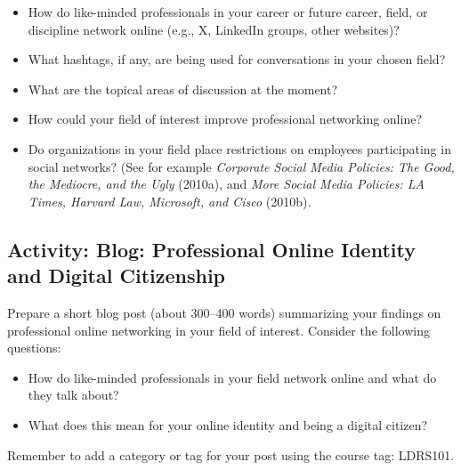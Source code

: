 \documentclass[
  letterpaper,
  DIV=11,
  numbers=noendperiod]{scrreprt}
\providecommand{\tightlist}{%
  \setlength{\itemsep}{0pt}\setlength{\parskip}{0pt}}\usepackage{longtable,booktabs,array}
\begin{document}
\begin{tcolorbox}
\begin{itemize}
\tightlist
\item
  How do like-minded professionals in your career or future career,
  field, or discipline network online (e.g., X, LinkedIn groups, other
  websites)?
\item
  What hashtags, if any, are being used for conversations in your chosen
  field?
\item
  What are the topical areas of discussion at the moment?
\item
  How could your field of interest improve professional networking
  online?
\item
  Do organizations in your field place restrictions on employees
  participating in social networks? (See for example \emph{Corporate
  Social Media Policies: The Good, the Mediocre, and the Ugly} (2010a),
  and \emph{More Social Media Policies: LA Times, Harvard Law,
  Microsoft, and Cisco} (2010b)\emph{.}
\end{itemize}

\end{tcolorbox}

\subsection{Activity: Blog: Professional Online Identity and Digital
Citizenship}\label{activity-blog-professional-online-identity-and-digital-citizenship}

\begin{tcolorbox}[enhanced jigsaw, toprule=.15mm, colback=white, colframe=quarto-callout-note-color-frame, bottomtitle=1mm, leftrule=.75mm, coltitle=black, titlerule=0mm, rightrule=.15mm, colbacktitle=quarto-callout-note-color!10!white, left=2mm, title={Learning Activity}, opacitybacktitle=0.6, opacityback=0, breakable, toptitle=1mm, arc=.35mm, bottomrule=.15mm]

Prepare a short blog post (about 300--400 words) summarizing your
findings on professional online networking in your field of interest.
Consider the following questions:

\begin{itemize}
\tightlist
\item
  How do like-minded professionals in your field network online and what
  do they talk about?
\item
  What does this mean for your online identity and being a digital
  citizen?
\end{itemize}

Remember to add a category or tag for your post using the course tag:
LDRS101.

\end{tcolorbox}
\end{document}
